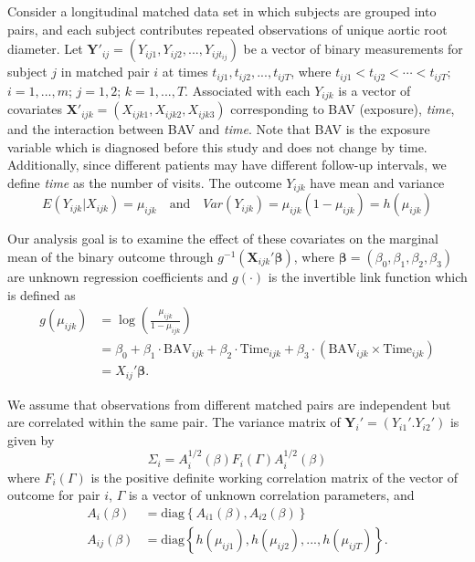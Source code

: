 \documentclass[
]{aft}
\begin{document}
Consider a longitudinal matched data set in which subjects are grouped
into pairs, and each subject contributes repeated observations of unique
aortic root diameter. Let
\(\boldsymbol{Y}'_{ij} = (Y_{ij1}, Y_{ij2}, ..., Y_{ijt_{ij}})\) be a
vector of binary measurements for subject \(j\) in matched pair \(i\) at
times \(t_{ij1}, t_{ij2}, ..., t_{ijT}\), where
\(t_{ij1} < t_{ij2} < \cdots < t_{ijT}\); \(i = 1,..., m\);
\(j = 1, 2\); \(k = 1,...,T\). Associated with each \(Y_{ijk}\) is a
vector of covariates
\(\boldsymbol{X}'_{ijk} = (X_{ijk1}, X_{ijk2}, X_{ijk3})\) corresponding
to BAV (exposure), \emph{time}, and the interaction between BAV and
\emph{time}. Note that BAV is the exposure variable which is diagnosed
before this study and does not change by time. Additionally, since
different patients may have different follow-up intervals, we define
\emph{time} as the number of visits. The outcome \(Y_{ijk}\) have mean
and variance \[
E(Y_{ijk} | X_{ijk}) = \mu_{ijk} \quad \text{and} \quad Var(Y_{ijk}) = \mu_{ijk}(1-\mu_{ijk}) = h(\mu_{ijk})
\]

Our analysis goal is to examine the effect of these covariates on the
marginal mean of the binary outcome through
\(g^{-1}(\boldsymbol{X}_{ijk}'\boldsymbol{\beta})\), where
\(\boldsymbol{\beta} = (\beta_0, \beta_1, \beta_2,\beta_3)\) are unknown
regression coefficients and \(g(\cdot)\) is the invertible link function
which is defined as \[
\begin{aligned}
g(\mu_{ijk}) &= \log(\frac{\mu_{ijk}}{1-\mu_{ijk}}) \\
&= \beta_0 + \beta_1\cdot \text{BAV}_{ijk} + \beta_2 \cdot \text{Time}_{ijk} + \beta_3\cdot (\text{BAV}_{ijk} \times \text{Time}_{ijk})\\
&= X_{ij}'\boldsymbol{\beta}.
\end{aligned}
\]

We assume that observations from different matched pairs are independent
but are correlated within the same pair. The variance matrix of
\(\boldsymbol{Y}_i' = (Y_{i1}'. Y_{i2}')\) is given by \[
\Sigma_i = A_i^{1/2}(\beta) F_i(\Gamma) A_i^{1/2} (\beta) 
\] where \(F_i(\Gamma)\) is the positive definite working correlation
matrix of the vector of outcome for pair \(i\), \(\Gamma\) is a vector
of unknown correlation parameters, and \begin{align}
A_i(\beta) &= \text{diag}\left\{A_{i1}(\beta), A_{i2}(\beta)\right\} \label{eq: Aibeta}\\
A_{ij}(\beta) & = \text{diag}\left\{h(\mu_{ij1}), h(\mu_{ij2}),...,h(\mu_{ijT})\right\} \label{eq: Aij}.
\end{align}
\end{document}
